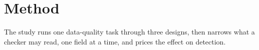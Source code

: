 \section{Method}
\label{sec:method}

The study runs one data-quality task through three designs, then narrows what a checker may read,
one field at a time, and prices the effect on detection.
